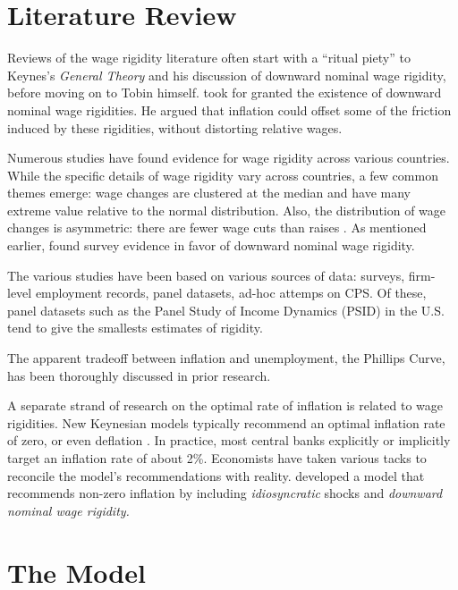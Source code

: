 \documentclass[12pt,a4paper]{scrartcl}            %
\begin{document}
\section{Literature Review}
\label{sec:literature_review}
Reviews of the wage rigidity literature often start with a ``ritual piety'' \citep{tobin_1972} to Keynes's \emph{General Theory} and his discussion of downward nominal wage rigidity, before moving on to Tobin himself.
\cite{tobin_1972} took for granted the existence of downward nominal wage rigidities.
He argued that inflation could offset some of the friction induced by these rigidities, without distorting relative wages.

Numerous studies have found evidence for wage rigidity across various countries.
While the specific details of wage rigidity vary across countries, a few common themes emerge:
wage changes are clustered at the median and have many extreme value relative to the normal distribution.
Also, the distribution of wage changes is asymmetric: there are fewer wage cuts than raises \citep{dickens_et_al_2006}.
As mentioned earlier, \cite{bewley_2007} found survey evidence in favor of downward nominal wage rigidity.

The various studies have been based on various sources of data:
surveys, firm-level employment records, panel datasets, ad-hoc attemps on CPS.
Of these, panel datasets such as the Panel Study of Income Dynamics (PSID) in the U.S. tend to give the smallests estimates of rigidity.

The apparent tradeoff between inflation and unemployment, the Phillips Curve, has been thoroughly discussed in prior research.

A separate strand of research on the optimal rate of inflation is related to wage rigidities.
New Keynesian models typically recommend an optimal inflation rate of zero, or even deflation \citep{schmitt-grohe_uribe_2010}.
In practice, most central banks explicitly or implicitly target an inflation rate of about 2\%.
Economists have taken various tacks to reconcile the model's recommendations with reality.
\cite{benigno_ricci_2011} developed a model that recommends non-zero inflation by including \emph{idiosyncratic} shocks and \emph{downward nominal wage rigidity.}



\section{The Model}
\label{sec:the_model}
\end{document}
